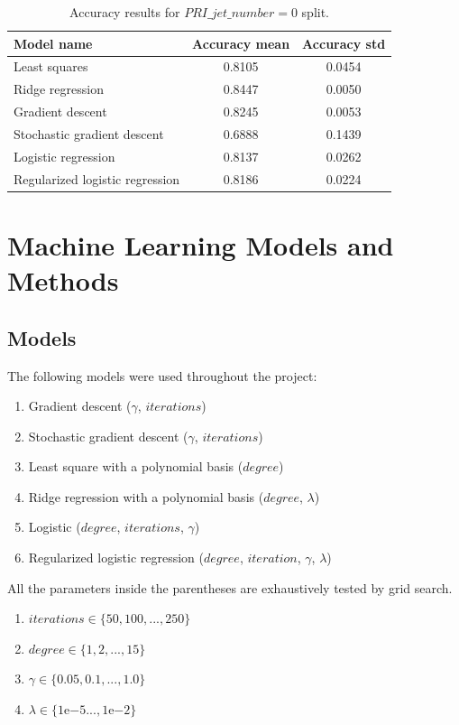 \documentclass[10pt,conference,compsocconf]{IEEEtran}
\begin{document}
\begin{table}[htbp]
  \centering
  \begin{tabular}[c]{|l||c|c|}
    \hline
    Model name&Accuracy mean&Accuracy std\\
    \hline
    Least squares&0.8105&0.0454\\
    Ridge regression&0.8447&0.0050\\
    Gradient descent&0.8245&0.0053\\
    Stochastic gradient descent&0.6888&0.1439\\
    Logistic regression&0.8137&0.0262\\
    Regularized logistic regression&0.8186&0.0224\\
    \hline
  \end{tabular}
  \caption{Accuracy results for $PRI\_jet\_number=0$ split.}
  \label{tab:jet0}
\end{table}

\section{Machine Learning Models and Methods}

\subsection{Models}

The following models were used throughout the project:

\begin{enumerate}
\item Gradient descent ($\gamma$, $iterations$)
\item Stochastic gradient descent ($\gamma$, $iterations$)
\item Least square with a polynomial basis ($degree$)
\item Ridge regression with a polynomial basis ($degree$, $\lambda$)
\item Logistic ($degree$, $iterations$, $\gamma$)
\item Regularized logistic regression ($degree$, $iteration$, $\gamma$, $\lambda$)
\end{enumerate}

All the parameters inside the parentheses are exhaustively tested by grid search. 

\begin{enumerate}
\item $iterations \in \{50, 100, ... , 250\}$
\item $degree \in \{1, 2, ... , 15\}$
\item $\gamma \in \{0.05, 0.1, ... , 1.0\}$
\item $\lambda \in \{1\mathrm{e}{-5} ... , 1\mathrm{e}{-2}\}$
\end{enumerate}
\end{document}
